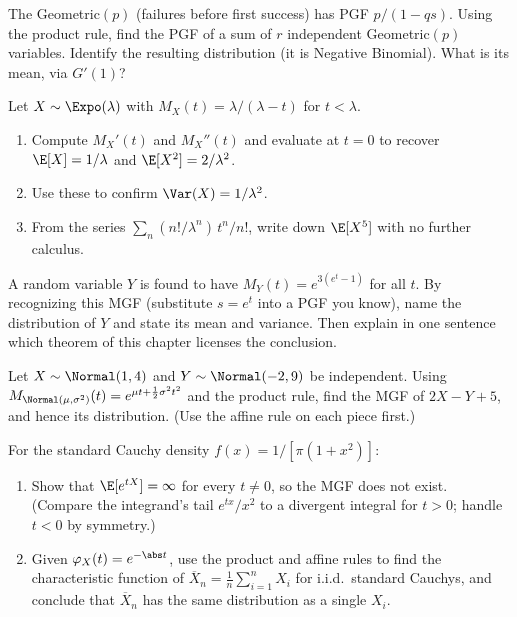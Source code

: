 \begin{exercise}
\label{ch18:ex-negbin}
The Geometric$(p)$ (failures before first success) has PGF $p/(1-qs)$. Using the
product rule, find the PGF of a sum of $r$ independent Geometric$(p)$ variables.
Identify the resulting distribution (it is Negative Binomial). What is its mean,
via $G'(1)$?
\end{exercise}

\begin{exercise}
\label{ch18:ex-mgf-moments}
Let $X\sim\Expo(\lambda)$ with $M_X(t)=\lambda/(\lambda-t)$ for $t<\lambda$.
\begin{enumerate}[label=(\alph*)]
  \item Compute $M_X'(t)$ and $M_X''(t)$ and evaluate at $t=0$ to recover
        $\E[X]=1/\lambda$ and $\E[X^2]=2/\lambda^2$.
  \item Use these to confirm $\Var(X)=1/\lambda^2$.
  \item From the series $\sum_n (n!/\lambda^n)\,t^n/n!$, write down $\E[X^5]$
        with no further calculus.
\end{enumerate}
\end{exercise}

\begin{exercise}
\label{ch18:ex-identify}
A random variable $Y$ is found to have $M_Y(t)=e^{3(e^t-1)}$ for all $t$. By
recognizing this MGF (substitute $s=e^t$ into a PGF you know), name the
distribution of $Y$ and state its mean and variance. Then explain in one
sentence which theorem of this chapter licenses the conclusion.
\end{exercise}

\begin{exercise}
\label{ch18:ex-normal-sum-prob}
Let $X\sim\Normal(1,4)$ and $Y\sim\Normal(-2,9)$ be independent. Using
$M_{\Normal(\mu,\sigma^2)}(t)=e^{\mu t+\frac12\sigma^2 t^2}$ and the product
rule, find the MGF of $2X - Y + 5$, and hence its distribution. (Use the affine
rule on each piece first.)
\end{exercise}

\begin{exercise}
\label{ch18:ex-cauchy-mgf}
For the standard Cauchy density $f(x)=1/[\pi(1+x^2)]$:
\begin{enumerate}[label=(\alph*)]
  \item Show that $\E[e^{tX}]=\infty$ for every $t\ne 0$, so the MGF does not
        exist. (Compare the integrand's tail $e^{tx}/x^2$ to a divergent
        integral for $t>0$; handle $t<0$ by symmetry.)
  \item Given $\varphi_X(t)=e^{-\abs t}$, use the product and affine rules to
        find the characteristic function of $\overline X_n=\frac1n\sum_{i=1}^n
        X_i$ for i.i.d.\ standard Cauchys, and conclude that $\overline X_n$ has
        the same distribution as a single $X_i$.
\end{enumerate}
\end{exercise}

